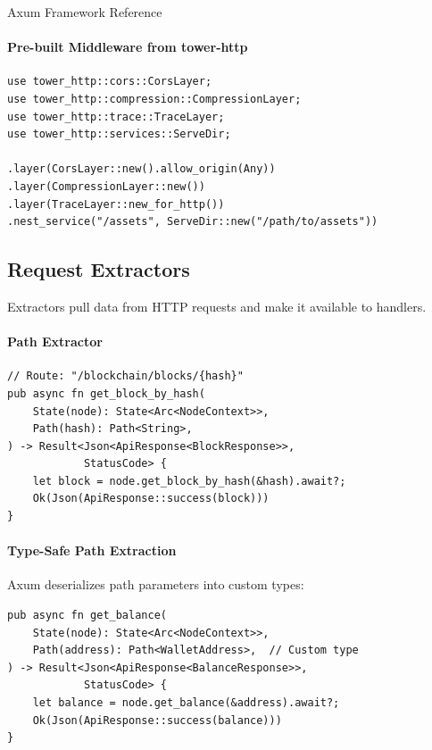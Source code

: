 \begin{deepdive}{Axum Framework Reference}
\paragraph{Pre-built Middleware from tower-http}

\begin{listing}[H]
\caption{Tower HTTP middleware components}
\label{lst:tower-http-middleware}
\begin{verbatim}
use tower_http::cors::CorsLayer;
use tower_http::compression::CompressionLayer;
use tower_http::trace::TraceLayer;
use tower_http::services::ServeDir;

.layer(CorsLayer::new().allow_origin(Any))
.layer(CompressionLayer::new())
.layer(TraceLayer::new_for_http())
.nest_service("/assets", ServeDir::new("/path/to/assets"))
\end{verbatim}
\end{listing}

\subsection{Request Extractors}

Extractors pull data from HTTP requests and make it available to handlers.

\paragraph{Path Extractor}

\begin{listing}[H]
\caption{Path parameter extraction}
\label{lst:axum-path-extractor}
\begin{verbatim}
// Route: "/blockchain/blocks/{hash}"
pub async fn get_block_by_hash(
    State(node): State<Arc<NodeContext>>,
    Path(hash): Path<String>,
) -> Result<Json<ApiResponse<BlockResponse>>,
            StatusCode> {
    let block = node.get_block_by_hash(&hash).await?;
    Ok(Json(ApiResponse::success(block)))
}
\end{verbatim}
\end{listing}

\paragraph{Type-Safe Path Extraction}

Axum deserializes path parameters into custom types:

\begin{listing}[H]
\caption{Custom type path extraction}
\label{lst:axum-typed-path}
\begin{verbatim}
pub async fn get_balance(
    State(node): State<Arc<NodeContext>>,
    Path(address): Path<WalletAddress>,  // Custom type
) -> Result<Json<ApiResponse<BalanceResponse>>,
            StatusCode> {
    let balance = node.get_balance(&address).await?;
    Ok(Json(ApiResponse::success(balance)))
}
\end{verbatim}
\end{listing}


\end{deepdive}
